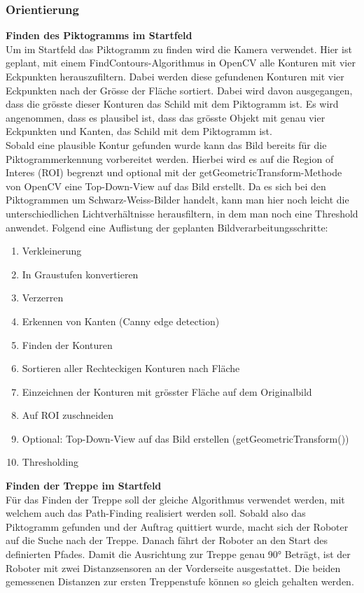 \subsubsection{Orientierung}
\textbf{Finden des Piktogramms im Startfeld}\\
Um im Startfeld das Piktogramm zu finden wird die Kamera verwendet. Hier ist geplant, mit einem FindContours-Algorithmus \cite{OpenCV-Fining-Contours} in OpenCV alle Konturen mit vier Eckpunkten herauszufiltern. Dabei werden diese gefundenen Konturen mit vier Eckpunkten nach der Grösse der Fläche sortiert. Dabei wird davon ausgegangen, dass die grösste dieser Konturen das Schild mit dem Piktogramm ist. Es wird angenommen, dass es plausibel ist, dass das grösste Objekt mit genau vier Eckpunkten und Kanten, das Schild mit dem Piktogramm ist.\\ 
Sobald eine plausible Kontur gefunden wurde kann das Bild bereits für die Piktogrammerkennung vorbereitet werden. Hierbei wird es auf die Region of Interes (ROI) begrenzt und optional mit der getGeometricTransform-Methode von OpenCV eine Top-Down-View auf das Bild erstellt. Da es sich bei den Piktogrammen um Schwarz-Weiss-Bilder handelt, kann man hier noch leicht die unterschiedlichen Lichtverhältnisse herausfiltern, in dem man noch eine Threshold anwendet.
Folgend eine Auflistung der geplanten Bildverarbeitungsschritte:
\begin{enumerate}
    \item Verkleinerung
    \item In Graustufen konvertieren 
    \item Verzerren
    \item Erkennen von Kanten (Canny edge detection)
    \item Finden der Konturen
    \item Sortieren aller Rechteckigen Konturen nach Fläche
    \item Einzeichnen der Konturen mit grösster Fläche auf dem Originalbild
    \item Auf ROI zuschneiden
    \item Optional: Top-Down-View auf das Bild erstellen (getGeometricTransform())
    \item Thresholding
\end{enumerate}

\textbf{Finden der Treppe im Startfeld}\\
Für das Finden der Treppe soll der gleiche Algorithmus verwendet werden, mit welchem auch das Path-Finding realisiert werden soll. Sobald also das Piktogramm gefunden und der Auftrag quittiert wurde, macht sich der Roboter auf die Suche nach der Treppe. Danach fährt der Roboter an den Start des definierten Pfades. Damit die Ausrichtung zur Treppe genau 90° Beträgt, ist der Roboter mit zwei Distanzsensoren an der Vorderseite ausgestattet. Die beiden gemessenen Distanzen zur ersten Treppenstufe können so gleich gehalten werden.

